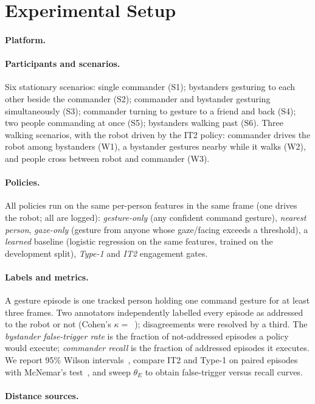 \section{Experimental Setup}
\label{sec:experiments}

\paragraph{Platform.} 

\paragraph{Participants and scenarios.}  Six stationary scenarios: single commander (S1);
bystanders gesturing to each other beside the commander (S2); commander and
bystander gesturing simultaneously (S3); commander turning to gesture to a
friend and back (S4); two people commanding at once (S5); bystanders walking
past (S6). Three walking scenarios, with the robot driven by the IT2 policy:
commander drives the robot among bystanders (W1), a bystander gestures nearby
while it walks (W2), and people cross between robot and commander (W3).



\paragraph{Policies.} All policies run on the same per-person features in the
same frame (one drives the robot; all are logged): \emph{gesture-only} (any
confident command gesture), \emph{nearest person}, \emph{gaze-only} (gesture
from anyone whose gaze/facing exceeds a threshold), a \emph{learned} baseline
(logistic regression on the same features, trained on the development split),
\emph{Type-1} and \emph{IT2} engagement gates.

\paragraph{Labels and metrics.} A gesture episode is one tracked person
holding one command gesture for at least three frames. Two annotators
independently labelled every episode as addressed to the robot or not
(Cohen's $\kappa=$\RES{}~\cite{cohen1960kappa}); disagreements were resolved
by a third. The \emph{bystander false-trigger rate} is the fraction of
not-addressed episodes a policy would execute; \emph{commander recall} is the
fraction of addressed episodes it executes. We report 95\% Wilson
intervals~\cite{wilson1927probable}, compare IT2 and Type-1 on paired
episodes with McNemar's test~\cite{mcnemar1947note}, and sweep $\theta_E$ to
obtain false-trigger versus recall curves.

\paragraph{Distance sources.} 
